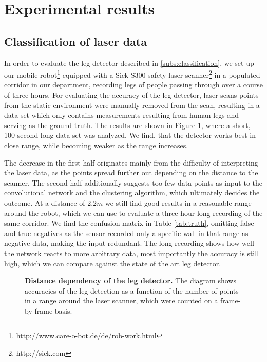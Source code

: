 \section{Experimental results}
\label{sec:Experiment}

\subsection{Classification of laser data}

In order to evaluate the leg detector described in \ref{subs:classification}, we set up our mobile robot\footnote{http://www.care-o-bot.de/de/rob-work.html} equipped with a Sick S300 safety laser scanner\footnote{http://sick.com} in a populated corridor in our department, recording legs of people passing through over a course of three hours. 
For evaluating the accuracy of the leg detector, laser scans points from the static environment were manually removed from the scan, resulting in a data set which only contains measurements resulting from human legs and serving as the ground truth.
The results are shown in Figure \ref{fig:radius_detection}, where a short, 100 second long data set was analyzed.
We find, that the detector works best in close range, while becoming weaker as the range increases. 

The decrease in the first half originates mainly from the difficulty of interpreting the laser data, as the points spread further out depending on the distance to the scanner. The second half additionally suggests too few data points as input to the convolutional network and the clustering algorithm, which ultimately decides the outcome.
At a distance of $2.2 m$ we still find good results in a reasonable range around the robot, which we can use to evaluate a three hour long recording of the same corridor. We find the confusion matrix in Table \ref{tab:truth}, omitting false and true negatives as the sensor recorded only a specific wall in that range as negative data, making the input redundant. The long recording shows how well the network reacts to more arbitrary data, most importantly the accuracy is still high, which we can compare against the state of the art leg detector.

\begin{figure}
	\normalsize
	\begin{center}
		
	\end{center}
	\caption{\textbf{Distance dependency of the leg detector.} The diagram shows accuracies of the leg detection as a function of the number of points in a range around the laser scanner, which were counted on a frame-by-frame basis.}
	\label{fig:radius_detection}
\end{figure}

